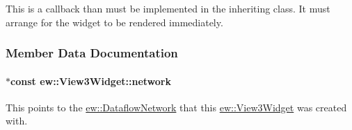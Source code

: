 \label{classew_1_1View3Widget_a07646a3ab6c2cb89907df00e21825fa3}
This is a callback than must be implemented in the inheriting class. It must arrange for the widget to be rendered immediately. 

\subsubsection{Member Data Documentation}
\hypertarget{classew_1_1View3Widget_ac8286c0fe23b39e10e53b161c03edb2a}{
\paragraph[{network}]{ $\ast$const {\bf ew::View3Widget::network}}\hfill}
\label{classew_1_1View3Widget_ac8286c0fe23b39e10e53b161c03edb2a}
This points to the \hyperlink{classew_1_1DataflowNetwork}{ew::DataflowNetwork} that this \hyperlink{classew_1_1View3Widget}{ew::View3Widget} was created with. 